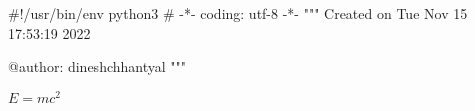 #!/usr/bin/env python3
# -*- coding: utf-8 -*-
"""
Created on Tue Nov 15 17:53:19 2022

@author: dineshchhantyal
"""



$E = mc^2$

